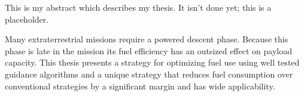 


This is my abstract which describes my thesis. It isn't done yet; this is a placeholder.

Many extraterrestrial missions require a powered descent phase. Because this phase is late in the mission its fuel efficiency has an outsized effect on payload capacity. This thesis presents a strategy for optimizing fuel use using well tested guidance algorithms and a unique strategy that reduces fuel consumption over conventional strategies by a significant margin and has wide applicability. 
